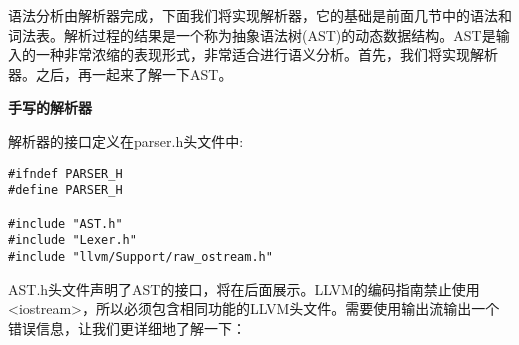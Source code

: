 语法分析由解析器完成，下面我们将实现解析器，它的基础是前面几节中的语法和词法表。解析过程的结果是一个称为抽象语法树(AST)的动态数据结构。AST是输入的一种非常浓缩的表现形式，非常适合进行语义分析。首先，我们将实现解析器。之后，再一起来了解一下AST。\par


\hspace*{\fill} \par %
\textbf{手写的解析器}

解析器的接口定义在parser.h头文件中:\par

\begin{lstlisting}[caption={}]
#ifndef PARSER_H
#define PARSER_H

#include "AST.h"
#include "Lexer.h"
#include "llvm/Support/raw_ostream.h"
\end{lstlisting}

AST.h头文件声明了AST的接口，将在后面展示。LLVM的编码指南禁止使用<iostream>，所以必须包含相同功能的LLVM头文件。需要使用输出流输出一个错误信息，让我们更详细地了解一下：\par

